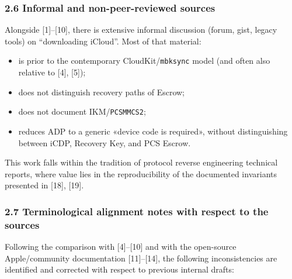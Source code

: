 \documentclass[
  english,
  10pt]{article}
\providecommand{\tightlist}{%
  \setlength{\itemsep}{0pt}\setlength{\parskip}{0pt}}
\begin{document}
\subsubsection{2.6 Informal and non-peer-reviewed
sources}\label{informal-and-non-peer-reviewed-sources}

Alongside {[}1{]}--{[}10{]}, there is extensive informal discussion
(forum, gist, legacy tools) on ``downloading iCloud''. Most of that
material:

\begin{itemize}
\tightlist
\item
  is prior to the contemporary CloudKit/\texttt{mbksync} model (and
  often also relative to {[}4{]}, {[}5{]});
\item
  does not distinguish recovery paths of Escrow;
\item
  does not document IKM/\texttt{PCSMMCS2};
\item
  reduces ADP to a generic «device code is required», without
  distinguishing between iCDP, Recovery Key, and PCS Escrow.
\end{itemize}

This work falls within the tradition of protocol reverse engineering
technical reports, where value lies in the reproducibility of the
documented invariants presented in {[}18{]}, {[}19{]}.

\subsubsection{2.7 Terminological alignment notes with respect to the
sources}\label{terminological-alignment-notes-with-respect-to-the-sources}

Following the comparison with {[}4{]}--{[}10{]} and with the open-source
Apple/community documentation {[}11{]}--{[}14{]}, the following
inconsistencies are identified and corrected with respect to previous
internal drafts:
\end{document}
